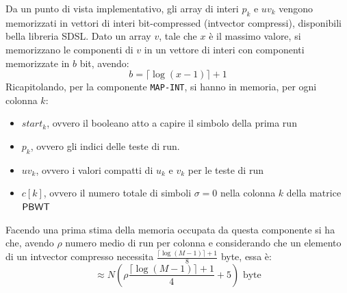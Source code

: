 Da un punto di vista implementativo, gli array di interi $p_k$ e $uv_k$ vengono
memorizzati in vettori di interi bit-compressed (intvector compressi),
disponibili bella libreria 
SDSL. Dato un array $v$, 
tale che $x$ è il massimo valore, si memorizzano le componenti di $v$ in un
vettore di interi con componenti memorizzate in $b$ bit, avendo:
\begin{equation}
  \label{eq:bc1}
  b=\lceil\log(x-1)\rceil+1
\end{equation}
Ricapitolando, per la componente \texttt{MAP-INT}, si hanno in memoria, per
ogni colonna $k$:
\begin{itemize}
  \item $start_k$, ovvero il booleano atto a capire il simbolo della prima
  run
  \item $p_k$, ovvero gli indici delle teste di run. 
  \item $uv_k$, ovvero i valori compatti di $u_k$ e $v_k$ per le teste di run
  \item $c[k]$, ovvero il numero totale di simboli $\sigma=0$ nella colonna
  $k$ della matrice $\mbox{\rm {\sf PBWT}}$
\end{itemize}
Facendo una prima stima della memoria occupata da questa componente si ha che,
avendo $\rho$ numero medio di run per colonna e considerando che un elemento di
un intvector 
compresso necessita $\frac{\lceil\log(M-1)\rceil+1}{8}$ byte, essa è:
\begin{equation}
  \label{eq:mapintmem}
  \approx N\left(\rho\frac{\lceil\log(M-1)\rceil+1}{4}+5\right)\mbox{ byte}
\end{equation}
